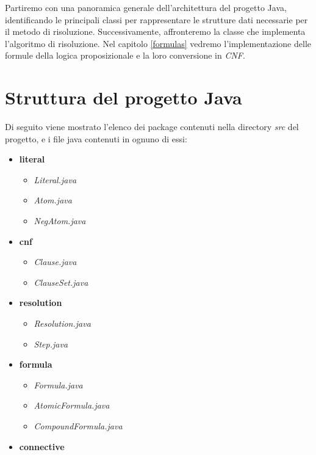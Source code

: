 \documentclass[a4paper,12pt]{report}
\begin{document}
Partiremo con una panoramica generale dell'architettura del progetto Java, identificando le principali classi per rappresentare le strutture dati necessarie per il metodo di risoluzione. Successivamente, affronteremo la classe che implementa l'algoritmo di risoluzione. Nel capitolo \ref{formulas} vedremo l'implementazione delle formule della logica proposizionale e la loro conversione in \emph{CNF}.

\section{Struttura del progetto Java}
\label{project_structure}

Di seguito viene mostrato l'elenco dei package contenuti nella directory \emph{src} del progetto, e i file java contenuti in ognuno di essi:
\begin{itemize}
    \item \textbf{literal}
        \begin{itemize}
            \item \emph{Literal.java}
            \item \emph{Atom.java}
            \item \emph{NegAtom.java}
        \end{itemize}
    \item \textbf{cnf}
        \begin{itemize}
            \item \emph{Clause.java}
            \item \emph{ClauseSet.java}
        \end{itemize}
    \item \textbf{resolution}
        \begin{itemize}
            \item \emph{Resolution.java}
            \item \emph{Step.java}
        \end{itemize}
    \item \textbf{formula}
        \begin{itemize}
            \item \emph{Formula.java}
            \item \emph{AtomicFormula.java}
            \item \emph{CompoundFormula.java}
        \end{itemize}
    \item \textbf{connective}
        \begin{itemize}

\end{itemize}
\end{itemize}
\end{document}
